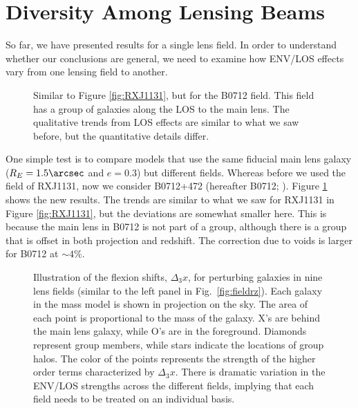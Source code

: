\documentclass{emulateapj}
\begin{document}
\section{Diversity Among Lensing Beams}
\label{sec:Environments}

So far, we have presented results for a single lens field.  In order to understand whether our conclusions are general, we need to examine how ENV/LOS effects vary from one lensing field to another.

\begin{figure}[t]
\begin{center}
\caption{\label{fig:B0712} Similar to Figure \ref{fig:RXJ1131}, but for the B0712 field.  This field has a group of galaxies along the LOS to the main lens.  The qualitative trends from LOS effects are similar to what we saw before, but the quantitative details differ.%
}
\end{center}
\end{figure}

One simple test is to compare models that use the same fiducial main lens galaxy ($R_E = 1.5\arcsec$ and $e=0.3$) but different fields.  Whereas before we used the field of RXJ1131, now we consider B0712+472 (hereafter B0712; \citealt{Jackson98}).  Figure \ref{fig:B0712} shows the new results.  The trends are similar to what we saw for RXJ1131 in Figure \ref{fig:RXJ1131}, but the deviations are somewhat smaller here.  This is because the main lens in B0712 is not part of a group, although there is a group that is offset in both projection and redshift.  The correction due to voids is larger for B0712 at $\sim4\%$.

\begin{figure}[t]
\begin{center}
\caption{\label{fig:allfields} Illustration of the flexion shifts, $\Delta_3 x$, for perturbing galaxies in nine lens fields (similar to the left panel in Fig.\ \ref{fig:fieldrz}). Each galaxy in the mass model is shown in projection on the sky. The area of each point is proportional to the mass of the galaxy. X's are behind the main lens galaxy, while O's are in the foreground. Diamonds represent group members, while stars indicate the locations of group halos. The color of the points represents the strength of the higher order terms characterized by $\Delta_3 x$. There is dramatic variation in the ENV/LOS strengths across the different fields, implying that each field needs to be treated on an individual basis.%
}
\end{center}
\end{figure}
\end{document}
